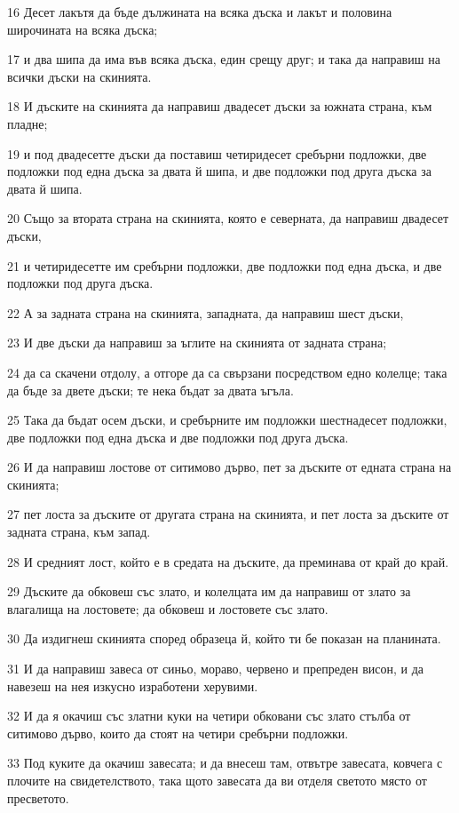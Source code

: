 \par 16 Десет лакътя да бъде дължината на всяка дъска и лакът и половина широчината на всяка дъска;
\par 17 и два шипа да има във всяка дъска, един срещу друг; и така да направиш на всички дъски на скинията.
\par 18 И дъските на скинията да направиш двадесет дъски за южната страна, към пладне;
\par 19 и под двадесетте дъски да поставиш четиридесет сребърни подложки, две подложки под една дъска за двата й шипа, и две подложки под друга дъска за двата й шипа.
\par 20 Също за втората страна на скинията, която е северната, да направиш двадесет дъски,
\par 21 и четиридесетте им сребърни подложки, две подложки под една дъска, и две подложки под друга дъска.
\par 22 А за задната страна на скинията, западната, да направиш шест дъски,
\par 23 И две дъски да направиш за ъглите на скинията от задната страна;
\par 24 да са скачени отдолу, а отгоре да са свързани посредством едно колелце; така да бъде за двете дъски; те нека бъдат за двата ъгъла.
\par 25 Така да бъдат осем дъски, и сребърните им подложки шестнадесет подложки, две подложки под една дъска и две подложки под друга дъска.
\par 26 И да направиш лостове от ситимово дърво, пет за дъските от едната страна на скинията;
\par 27 пет лоста за дъските от другата страна на скинията, и пет лоста за дъските от задната страна, към запад.
\par 28 И средният лост, който е в средата на дъските, да преминава от край до край.
\par 29 Дъските да обковеш със злато, и колелцата им да направиш от злато за влагалища на лостовете; да обковеш и лостовете със злато.
\par 30 Да издигнеш скинията според образеца й, който ти бе показан на планината.
\par 31 И да направиш завеса от синьо, мораво, червено и препреден висон, и да навезеш на нея изкусно изработени херувими.
\par 32 И да я окачиш със златни куки на четири обковани със злато стълба от ситимово дърво, които да стоят на четири сребърни подложки.
\par 33 Под куките да окачиш завесата; и да внесеш там, отвътре завесата, ковчега с плочите на свидетелството, така щото завесата да ви отделя светото място от пресветото.
